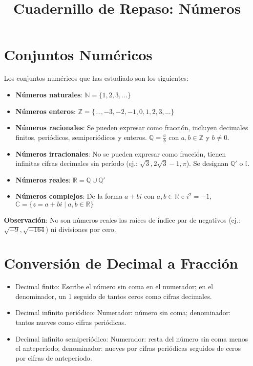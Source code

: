 \documentclass[12pt]{article}
\title{Cuadernillo de Repaso: Números}
\author{}
\date{}
\begin{document}
\maketitle

\section*{Conjuntos Numéricos}

Los conjuntos numéricos que has estudiado son los siguientes:

\begin{itemize}
  \item \textbf{Números naturales}: $\mathbb{N} = \{1, 2, 3, \dots\}$
  \item \textbf{Números enteros}: $\mathbb{Z} = \{\dots, -3, -2, -1, 0, 1, 2, 3, \dots\}$
  \item \textbf{Números racionales}: Se pueden expresar como fracción, incluyen decimales finitos, periódicos, semiperiódicos y enteros. $\mathbb{Q} = \frac{a}{b}$ con $a, b \in \mathbb{Z}$ y $b \neq 0$.
  \item \textbf{Números irracionales}: No se pueden expresar como fracción, tienen infinitas cifras decimales sin período (ej.: $\sqrt{3}, 2\sqrt{3}-1, \pi$). Se designan $\mathbb{Q}'$ o $\mathbb{I}$.
  \item \textbf{Números reales}: $\mathbb{R} = \mathbb{Q} \cup \mathbb{Q}'$
  \item \textbf{Números complejos}: De la forma $a + bi$ con $a, b \in \mathbb{R}$ e $i^2 = -1$, $\mathbb{C} = \{z = a + bi \mid a, b \in \mathbb{R}\}$
\end{itemize}

\textbf{Observación}: No son números reales las raíces de índice par de negativos (ej.: $\sqrt{-9}, \sqrt{-164}$) ni divisiones por cero.

\section*{Conversión de Decimal a Fracción}

\begin{itemize}
  \item Decimal finito: Escribe el número sin coma en el numerador; en el denominador, un 1 seguido de tantos ceros como cifras decimales.
  \item Decimal infinito periódico: Numerador: número sin coma; denominador: tantos nueves como cifras periódicas.
  \item Decimal infinito semiperiódico: Numerador: resta del número sin coma menos el anteperíodo; denominador: nueves por cifras periódicas seguidos de ceros por cifras de anteperíodo.
\end{itemize}
\end{document}
